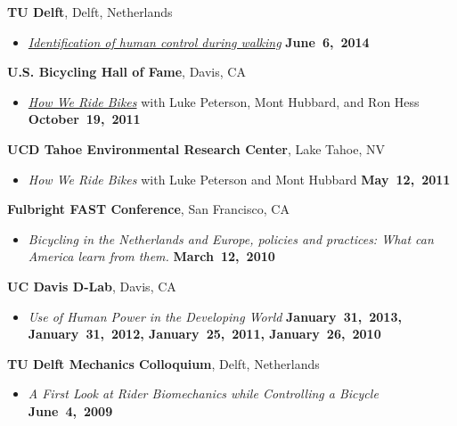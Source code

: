 \documentclass[10pt]{article}
\newenvironment{outerlist}[1][\enskip\textbullet]%
        {\begin{itemize}[#1]}{\end{itemize}%
         \vspace{-.6\baselineskip}}
\newenvironment{innerlist}[1][\enskip\textbullet]%
        {\begin{compactitem}[#1]}{\end{compactitem}}
\newcommand{\blankline}{\quad\pagebreak[2]}
\begin{document}
\begin{innerlist}
\blankline

\textbf{TU Delft}, Delft, Netherlands
\begin{outerlist}
\item[]
  \href{http://www.moorepants.info/presentations/2014/tu-delft-robotics-talk-2014}{\textit{Identification
  of human control during walking}}
    \hfill \textbf{June~6,~2014}
\end{outerlist}

\blankline

\textbf{U.S. Bicycling Hall of Fame}, Davis, CA
\begin{outerlist}
\item[] \textit{\href{http://mae.ucdavis.edu/~biosport/bhoftalk/}{How We Ride
  Bikes}} with Luke Peterson, Mont Hubbard, and Ron Hess
    \hfill \textbf{October~19,~2011}
\end{outerlist}

\blankline

\textbf{UCD Tahoe Environmental Research Center}, Lake Tahoe, NV
\begin{outerlist}
  \item[] \textit{How We Ride Bikes} with Luke Peterson and Mont Hubbard \hfill
    \textbf{May~12,~2011}
\end{outerlist}

\blankline

\textbf{Fulbright FAST Conference}, San Francisco, CA
\begin{outerlist}
  \item[] \textit{Bicycling in the Netherlands and Europe, policies and
    practices: What can America learn from them.}
    \hfill \textbf{March~12,~2010}
\end{outerlist}

\blankline

\textbf{UC Davis D-Lab}, Davis, CA
\begin{outerlist}
  \item[] \textit{Use of Human Power in the Developing World}
    \hfill \textbf{January~31,~2013, January~31,~2012, January~25,~2011, January~26,~2010}
\end{outerlist}

\blankline

\textbf{TU Delft Mechanics Colloquium}, Delft, Netherlands
\begin{outerlist}
  \item[] \textit{A First Look at Rider Biomechanics while Controlling a Bicycle}
    \hfill \textbf{June~4,~2009}
\end{outerlist}


\end{innerlist}
\end{document}
